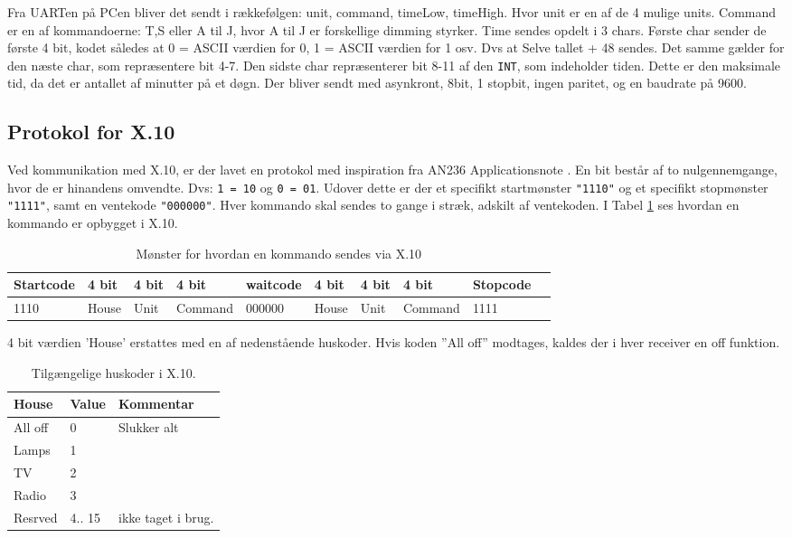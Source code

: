 Fra UARTen på PCen bliver det sendt i rækkefølgen: unit, command, timeLow, timeHigh. Hvor unit er en af de 4 mulige units. Command er en af kommandoerne: T,S eller A til J, hvor A til J er forskellige dimming styrker.
Time sendes opdelt i 3 chars. Første char sender de første 4 bit, kodet således at 0 = ASCII værdien for 0, 1 = ASCII værdien for 1 osv. Dvs at Selve tallet + 48 sendes. Det samme gælder for den næste char, som repræsentere bit 4-7. Den sidste char repræsenterer bit 8-11 af den \texttt{INT}, som indeholder tiden. Dette er den maksimale tid, da det er antallet af minutter på et døgn.
Der bliver sendt med asynkront, 8bit, 1 stopbit, ingen paritet, og en baudrate på 9600.

\clearpage

\subsection{Protokol for X.10}\label{prot_x10}

Ved kommunikation med X.10, er der lavet en protokol med inspiration fra AN236 Applicationsnote \cite{lib:AN236}. En bit består af to nulgennemgange, hvor de er hinandens omvendte. Dvs: \texttt{1 = 10} og \texttt{0 = 01}. Udover dette er der et specifikt startmønster \texttt{"1110"} og et specifikt stopmønster \texttt{"1111"}, samt en ventekode \texttt{"000000"}. Hver kommando skal sendes to gange i stræk, adskilt af ventekoden. I Tabel \ref{tbl:x.10pattern} ses hvordan en kommando er opbygget i X.10.

\begin{table} [h]
	\centering
    \begin{tabular}{|l|l|l|l|l|l|l|l|l|l|}
    \hline    
    Startcode & 4 bit & 4 bit & 4 bit & waitcode &  4 bit & 4 bit & 4 bit & Stopcode\\ \hline
    1110            & House & Unit & Command & 000000  &   House & Unit  & Command & 1111 \\ \hline
    \end{tabular}
\caption{Mønster for hvordan en kommando sendes via X.10}
\label{tbl:x.10pattern}
\end{table}

4 bit værdien 'House' erstattes med en af nedenstående huskoder. Hvis koden ''All off''  modtages, kaldes der i hver receiver en off funktion.

\begin{table} [h]
\centering
    \begin{tabular}{|l|l|l|}
    \hline
    House & Value  & Kommentar          \\ \hline
    All off & 0      & Slukker alt        \\ \hline
    Lamps   & 1      & ~                  \\ \hline
    TV      & 2      & ~                  \\ \hline
    Radio   & 3      & ~                  \\ \hline
    Resrved & 4.. 15 & ikke taget i brug. \\ \hline
    \end{tabular}
\caption{Tilgængelige huskoder i X.10.}
\end{table}


